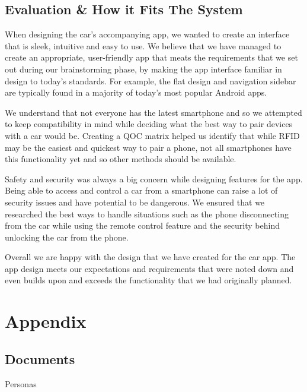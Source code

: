 \documentclass{article}
\begin{document}

\subsection{Evaluation \& How it Fits The System}\label{ssec:app-evaluation}
When designing the car's accompanying app, we wanted to create an interface that is sleek, intuitive and easy to use. We believe that we have managed to create an appropriate, user-friendly app that meats the requirements that we set out during our brainstorming phase, by making the app interface familiar in design to today's standards. For example, the flat design and navigation sidebar are typically found in a majority of today's most popular Android apps.

We understand that not everyone has the latest smartphone and so we attempted to keep compatibility in mind while deciding what the best way to pair devices with a car would be. Creating a QOC matrix helped us identify that while RFID may be the easiest and quickest way to pair a phone, not all smartphones have this functionality yet and so other methods should be available.

Safety and security was always a big concern while designing features for the app. Being able to access and control a car from a smartphone can raise a lot of security issues and have potential to be dangerous. We ensured that we researched the best ways to handle situations such as the phone disconnecting from the car while using the remote control feature and the security behind unlocking the car from the phone.

Overall we are happy with the design that we have created for the car app. The app design meets our expectations and requirements that were noted down and even builds upon and exceeds the functionality that we had originally planned.


\pagebreak

\printbibliography

\section{Appendix}\label{sec:appendix}
\subsection{Documents}\label{ssec:appendix-docs}
Personas
\end{document}
